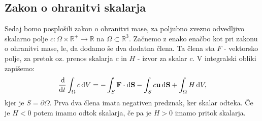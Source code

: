 \documentclass[mat2, tisk]{fmfdelo}
\newcommand{\R}{\mathbb R}
\newcommand{\bd}{\textbf}
\begin{document}
\subsection{Zakon o ohranitvi skalarja}
Sedaj bomo posplošili zakon o ohranitvi mase, za poljubno zvezno odvedljivo skalarno polje $c: \Omega \times \R^+ \rightarrow \R$ na 
$\Omega \subset \R^3$.
Začnemo z enako enačbo kot pri zakonu o ohranitvi mase, le, da dodamo še dva dodatna 
člena. Ta člena sta $F$ - vektorsko polje, za pretok oz. prenos skalarja $c$ in $H$ - izvor za skalar $c$.
V integralski obliki zapišemo:
\begin{equation}
\frac{\dif}{\dif t} \int_{\Omega} c \dif V = - \int_S \bd{F} \cdot \dif \bd{S} - 
\int_S c \bd{u}  \dif \bd{S} + \int_\Omega H \dif V,
\end{equation}
kjer je $S = \partial \Omega$.
Prva dva člena imata negativen predznak, ker skalar odteka. Če je $H < 0$ potem imamo odtok skalarja, če pa je $H > 0$ imamo pritok skalarja. 
\end{document}
